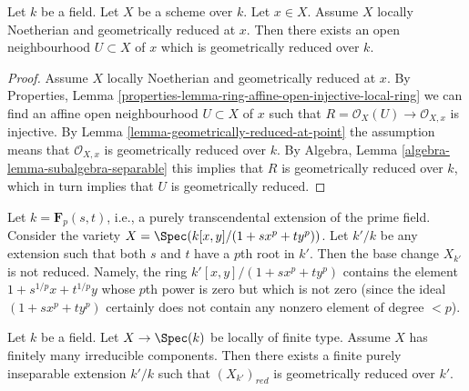 \begin{lemma}
\label{lemma-Noetherian-geometrically-reduced-at-point}
Let $k$ be a field.
Let $X$ be a scheme over $k$.
Let $x \in X$.
Assume $X$ locally Noetherian and geometrically reduced at $x$.
Then there exists an open neighbourhood $U \subset X$ of $x$
which is geometrically reduced over $k$.
\end{lemma}

\begin{proof}
Assume $X$ locally Noetherian and geometrically reduced at $x$.
By Properties, Lemma
\ref{properties-lemma-ring-affine-open-injective-local-ring}
we can find an affine open neighbourhood $U \subset X$ of $x$ such that
$R = \mathcal{O}_X(U) \to \mathcal{O}_{X, x}$
is injective. By
Lemma \ref{lemma-geometrically-reduced-at-point} the assumption
means that $\mathcal{O}_{X, x}$ is geometrically reduced over $k$.
By Algebra, Lemma \ref{algebra-lemma-subalgebra-separable}
this implies that $R$ is geometrically reduced over $k$, which
in turn implies that $U$ is geometrically reduced.
\end{proof}

\begin{example}
\label{example-not-geometrically-reduced}
Let $k = \mathbf{F}_p(s, t)$, i.e., a purely transcendental extension
of the prime field. Consider the variety
$X = \Spec(k[x, y]/(1 + sx^p + ty^p))$.
Let $k'/k$ be any extension such that
both $s$ and $t$ have a $p$th root in $k'$.
Then the base change $X_{k'}$ is not reduced.
Namely, the ring $k'[x, y]/(1 + s x^p + ty^p)$ contains the element
$1 + s^{1/p}x + t^{1/p}y$ whose $p$th power is zero but
which is not zero (since the ideal $(1 + sx^p + ty^p)$ certainly
does not contain any nonzero element of degree $< p$).
\end{example}

\begin{lemma}
\label{lemma-finite-extension-geometrically-reduced}
Let $k$ be a field.
Let $X \to \Spec(k)$ be locally of finite type.
Assume $X$ has finitely many irreducible components.
Then there exists a finite purely inseparable extension $k'/k$
such that $(X_{k'})_{red}$ is geometrically reduced over $k'$.
\end{lemma}

